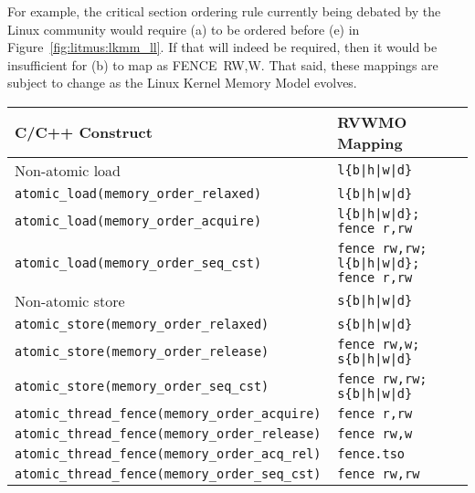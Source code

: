 For example, the critical section ordering rule currently being debated by the Linux community would require (a) to be ordered before (e) in Figure~\ref{fig:litmus:lkmm_ll}.
If that will indeed be required, then it would be insufficient for (b) to map as FENCE~RW,W.
That said, these mappings are subject to change as the Linux Kernel Memory Model evolves.

\begin{table}[h!]
  \centering
  \begin{tabular}{|l|l|}
    \hline
    C/C++ Construct                            & RVWMO Mapping \\
    \hline
    \hline
    Non-atomic load                            & \tt l\{b|h|w|d\}               \\
    \hline
    \tt atomic\_load(memory\_order\_relaxed)   & \tt l\{b|h|w|d\}               \\
    \hline
    \tt atomic\_load(memory\_order\_acquire)   & \tt l\{b|h|w|d\}; fence r,rw    \\
    \hline
    \tt atomic\_load(memory\_order\_seq\_cst)  & \tt fence rw,rw; l\{b|h|w|d\}; fence r,rw       \\
    \hline
    \hline
    Non-atomic store                           & \tt s\{b|h|w|d\}               \\
    \hline
    \tt atomic\_store(memory\_order\_relaxed)  & \tt s\{b|h|w|d\}               \\
    \hline
    \tt atomic\_store(memory\_order\_release)  & \tt fence rw,w; s\{b|h|w|d\}  \\
    \hline
    \tt atomic\_store(memory\_order\_seq\_cst) & \tt fence rw,rw; s\{b|h|w|d\} \\
    \hline
    \hline
    \tt atomic\_thread\_fence(memory\_order\_acquire)  & \tt fence r,rw \\
    \hline
    \tt atomic\_thread\_fence(memory\_order\_release)  & \tt fence rw,w \\
    \hline
    \tt atomic\_thread\_fence(memory\_order\_acq\_rel) & {\tt fence.tso} \\
    \hline
    \tt atomic\_thread\_fence(memory\_order\_seq\_cst) & \tt fence rw,rw \\
    \hline
  \end{tabular}

~


\end{table}
